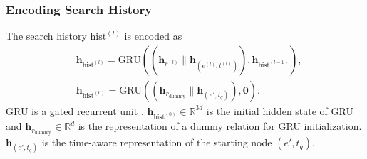 \documentclass[runningheads]{llncs}
\begin{document}
\subsubsection{Encoding Search History}
The search history $\text{hist}^{(l)}$ is encoded as
\begin{equation}
\begin{aligned}
        &\mathbf{h}_{\text{hist}^{(l)}} = \text{GRU}\left( \left(\mathbf{h}_{{r}^{(l)}} \| \mathbf{h}_{(e^{(l)}, t^{(l)})}\right),\mathbf{h}_{\text{hist}^{(l-1)}}\right),\\
        &\mathbf{h}_{\text{hist}^{(0)}} = \text{GRU}\left( \left(\mathbf{h}_{{r}_{\text{dummy}}} \| \mathbf{h}_{(e', t_q)}\right), \mathbf{0}\right).
\end{aligned}
\end{equation}
GRU is a gated recurrent unit \cite{DBLP:conf/emnlp/ChoMGBBSB14}. 
$\mathbf{h}_{\text{hist}^{(0)}} \in \mathbb{R}^{3d}$ is the initial hidden state of GRU 
and $\mathbf{h}_{{r}_{\text{dummy}}}\in \mathbb{R}^{d}$ is the representation of a dummy relation 
for GRU initialization. $\mathbf{h}_{(e', t_q)}$ is the time-aware representation of the starting node $(e', t_q)$. 
\end{document}

